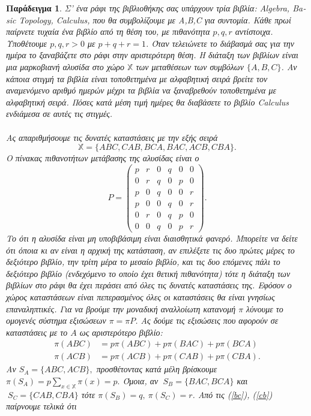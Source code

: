 \documentclass[11pt]{article}
\newcommand{\en}[1]{\textlatin{#1}}
\newtheorem{example}{Παράδειγμα}
\def\X{\mathbb{X}}
\begin{document}
\begin{example}
Σ' ένα ράφι της βιβλιοθήκης σας υπάρχουν τρία βιβλία: \en{Algebra, Basic Topology, Calculus}, που θα συμβολίζουμε με \en{A,B,C} για συντομία. Κάθε πρωί παίρνετε τυχαία ένα βιβλίο από τη θέση του, με πιθανότητα $p,q,r$ αντίστοιχα. Υποθέτουμε $p,q,r>0$ με $p+q+r=1$. Όταν τελειώνετε το διάβασμά σας για την ημέρα το ξαναβάζετε στο ράφι στην αριστερότερη θέση. Η διάταξη των βιβλίων είναι μια μαρκοβιανή αλυσίδα στο χώρο $\X$ των μεταθέσεων των συμβόλων $\{A,B,C\}$. Αν κάποια στιγμή τα βιβλία είναι τοποθετημένα με αλφαβητική σειρά βρείτε τον αναμενόμενο αριθμό ημερών μέχρι τα βιβλία να ξαναβρεθούν τοποθετημένα με αλφαβητική σειρά. Πόσες κατά μέση τιμή ημέρες θα διαβάσετε το βιβλίο \en{Calculus} ενδιάμεσα σε αυτές τις στιγμές.\\
\ \\ 
Ας απαριθμήσουμε τις δυνατές καταστάσεις με την εξής σειρά $$\X=\{ABC,CAB,BCA,BAC,ACB,CBA\}.$$ Ο πίνακας πιθανοτήτων μετάβασης της αλυσίδας είναι ο
\[
P=\left(\begin{array}{cccccc}p&r&0&q&0&0\\0&r&q&0&p&0\\p&0&q&0&0&r\\p&0&0&q&0&r\\0&r&0&q&p&0\\0&0&q&0&p&r\end{array}\right).
\]
Το ότι η αλυσίδα είναι μη υποβιβάσιμη είναι διαισθητικά φανερό. Μπορείτε να δείτε ότι όποια κι αν είναι η αρχική της κατάσταση, αν επιλέξετε τις δυο πρώτες μέρες το δεξιότερο βιβλίο, την τρίτη μέρα το μεσαίο βιβλίο, και τις δυο επόμενες πάλι το δεξιότερο βιβλίο (ενδεχόμενο το οποίο έχει θετική πιθανότητα) τότε η διάταξη των βιβλίων στο ράφι θα έχει περάσει από όλες τις δυνατές καταστάσεις της. Εφόσον ο χώρος καταστάσεων είναι πεπερασμένος όλες οι καταστάσεις θα είναι γνησίως επαναληπτικές. Για να βρούμε την μοναδική αναλλοίωτη κατανομή $\pi$ λύνουμε το ομογενές σύστημα εξισώσεων $\pi=\pi P$. Ας δούμε τις εξισώσεις που αφορούν σε καταστάσεις με το $A$ ως αριστερότερο βιβλίο:
\begin{align}
\pi(ABC)&=p\pi(ABC)+p\pi(BAC)+p\pi(BCA)\label{bc}\\
\pi(ACB)&=p\pi(ACB)+p\pi(CAB)+p\pi(CBA).\label{cb}
\end{align}
Αν $S_A=\{ABC,ACB\},$  προσθέτοντας κατά μέλη βρίσκουμε $\pi(S_A)=p\sum_{x\in\X}\pi(x)=p.$
Όμοια, αν $\ S_B=\{BAC,BCA\}$ και $\ S_C=\{CAB,CBA\}$ τότε $\pi(S_B)=q,\ \pi(S_C)=r$. Από τις (\ref{bc}), (\ref{cb}) παίρνουμε τελικά ότι 

\end{example}
\end{document}
